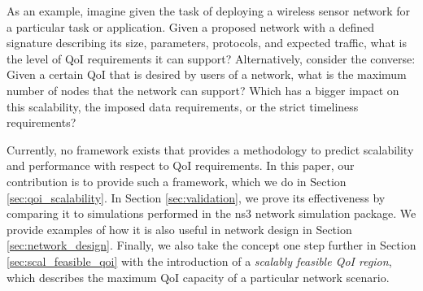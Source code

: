 As an example, imagine given the task of deploying a wireless sensor network for a particular task or application.  Given a proposed network with a defined signature describing its size, parameters, protocols, and expected traffic, what is the level of QoI requirements it can support?  Alternatively, consider the converse:  Given a certain QoI that is desired by users of a network, what is the maximum number of nodes that the network can support?  Which has a bigger impact on this scalability, the imposed data requirements, or the strict timeliness requirements?

Currently, no framework exists that provides a methodology to predict scalability and performance with respect to QoI requirements.  In this paper, our contribution is to provide such a framework, which we do in Section \ref{sec:qoi_scalability}.  In Section \ref{sec:validation}, we prove its effectiveness by comparing it to simulations performed in the ns3 network simulation package.  We provide examples of how it is also useful in network design in Section \ref{sec:network_design}.  Finally, we also take the concept one step further in Section \ref{sec:scal_feasible_qoi} with the introduction of a \emph{scalably feasible QoI region}, which describes the maximum QoI capacity of a particular network scenario.


